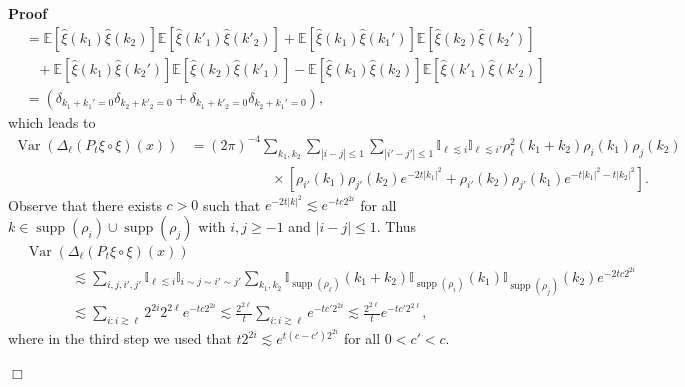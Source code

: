 \documentclass[a4paper,11pt]{article}
\newcommand{\tmop}[1]{\ensuremath{\operatorname{#1}}}
\newenvironment{proof}{\noindent\textbf{Proof\ }}{\hspace*{\fill}$\Box$\medskip}
\newcommand{\reso}{\,\mathord{\circ}\,}
\begin{document}
\begin{proof}
\begin{align*}
     & =\mathbb{E} [\hat{\xi} (k_1) \hat{\xi} (k_2)] \mathbb{E} [\hat{\xi}(k'_1) \hat{\xi} (k'_2)] +\mathbb{E} [\hat{\xi} (k_1) \hat{\xi} (k_1')] \mathbb{E} [\hat{\xi} (k_2) \hat{\xi} (k_2')] \\
     &\hspace{10pt} + \mathbb{E} [\hat{\xi} (k_1) \hat{\xi} (k_2')] \mathbb{E} [\hat{\xi}(k_2) \hat{\xi} (k'_1)] -\mathbb{E} [\hat{\xi} (k_1) \hat{\xi} (k_2)] \mathbb{E} [\hat{\xi} (k'_1) \hat{\xi} (k'_2)] \\
     & = (\delta_{k_1 + k_1' = 0} \delta_{k_2 + k'_2 = 0} + \delta_{k_1 + k'_2 = 0} \delta_{k_2 + k_1' = 0}),
  \end{align*}
  which leads to
  \begin{align*}
    \tmop{Var} (\Delta_{\ell} (P_t \xi \reso \xi) (x)) & = (2 \pi)^{- 4}
    \sum_{k_1, k_2} \sum_{|i - j| \leqslant 1} \sum_{|i' - j' | \leqslant 1}
    \mathbb{I}_{\ell \lesssim i} \mathbb{I}_{\ell \lesssim i'} \rho^2_{\ell}
    (k_1 + k_2) \rho_i (k_1) \rho_j (k_2) \\
    &\hspace{70pt} \times [\rho_{i'} (k_1) \rho_{j'} (k_2) e^{- 2 t|k_1 |^2} + \rho_{i'}
    (k_2) \rho_{j'} (k_1) e^{- t|k_1 |^2 - t|k_2 |^2}] .
  \end{align*}
  Observe that there exists $c > 0$ such that $e^{- 2 t |k|^2} \lesssim e^{- tc 2^{2 i}}$ for all $k \in \tmop{supp} (\rho_i) \cup \tmop{supp} (\rho_j)$ with $i,j \ge - 1$ and $|i-j| \leqslant 1$. Thus
  \begin{align*}
    & \tmop{Var} (\Delta_{\ell} (P_t \xi \reso \xi) (x)) \\
    & \hspace{40pt} \lesssim \sum_{i, j, i', j'} \mathbb{I}_{\ell \lesssim i} \mathbb{I}_{i \sim j \sim i' \sim j'} \sum_{k_1, k_2}  \mathbb{I}_{\tmop{supp} (\rho_{\ell})} (k_1 + k_2) \mathbb{I}_{\tmop{supp} (\rho_i)} (k_1) \mathbb{I}_{\tmop{supp} (\rho_j)} (k_2) e^{- 2 tc 2^{2 i}} \\
    & \hspace{40pt} \lesssim \sum_{i : i \gtrsim \ell} 2^{2 i} 2^{2 \ell} e^{- tc 2^{2 i}} \lesssim \frac{2^{2 \ell}}{t} \sum_{i : i \gtrsim \ell} e^{- tc' 2^{2 i}} \lesssim \frac{2^{2 \ell}}{t} e^{- tc' 2^{2 \ell}}, & 
  \end{align*}
  where in the third step we used that $t 2^{2 i} \lesssim e^{t (c - c') 2^{2 i}}$ for all $0< c' <
  c$.
  

\end{proof}
\end{document}
